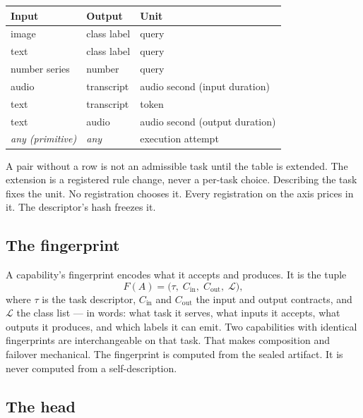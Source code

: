 \documentclass[11pt]{article}
\begin{document}
\begin{center}
\begin{tabular}{@{}lll@{}}
\toprule
\textbf{Input} & \textbf{Output} & \textbf{Unit} \\
\midrule
image & class label & query \\
text & class label & query \\
number series & number & query \\
audio & transcript & audio second (input duration) \\
text & transcript & token \\
text & audio & audio second (output duration) \\
\emph{any (primitive)} & \emph{any} & execution attempt \\
\bottomrule
\end{tabular}
\end{center}

A pair without a row is not an admissible task until the table is
extended. The extension is a registered rule change, never a
per-task choice. Describing the task fixes the unit. No
registration chooses it. Every registration on the axis prices in
it. The descriptor's hash freezes it.

\subsection{The fingerprint}

A capability's fingerprint encodes what it accepts and produces.
It is the tuple
\begin{equation}
F(A) = \bigl(\tau,\; C_{\mathrm{in}},\; C_{\mathrm{out}},\;
\mathcal{L}\bigr),
\end{equation}
where $\tau$ is the task descriptor, $C_{\mathrm{in}}$ and
$C_{\mathrm{out}}$ the input and output contracts, and
$\mathcal{L}$ the class list --- in words: what task it serves,
what inputs it accepts, what outputs it produces, and which
labels it can emit. Two capabilities with identical
fingerprints are interchangeable on that task. That makes
composition and failover mechanical. The fingerprint is computed
from the sealed artifact. It is never computed from a
self-description.

\subsection{The head}
\end{document}
